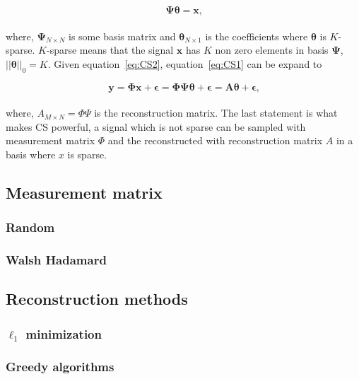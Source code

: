 \begin{equation}
\label{eq:CS2}
   \mathbf{ \Psi \theta = x }\text{,}
\end{equation}\\[0.1in]

where, $\mathbf{\Psi}_{N \times N}$ is some  basis matrix and
$\mathbf{\theta}_{N\times1}$ is the coefficients where $\mathbf{\theta}$ is $K$-sparse. $K$-sparse means that the signal $\mathbf{x}$ has $K$ non zero elements in basis $\mathbf{\Psi}$, $||\mathbf{\theta}||_0 = K$. Given equation~\ref{eq:CS2}, equation~\ref{eq:CS1} can be expand to


\begin{equation}
   \mathbf{ y = \Phi x + \epsilon = \Phi \Psi \theta + \epsilon = A \theta + \epsilon }\text{,}
\end{equation}\\[0.1in]

where, $A_{M \times N} = \Phi \Psi$ is the reconstruction matrix. The last statement is what makes CS powerful, a signal which is not sparse can be sampled with measurement matrix $\Phi$ and the reconstructed with reconstruction matrix $A$ in a basis where $x$ is sparse.

\subsection{Measurement matrix}
\subsubsection{Random}

\subsubsection{Walsh Hadamard}


\subsection{Reconstruction methods}

\subsubsection{$\ell_1$ minimization}

\subsubsection{Greedy algorithms}

